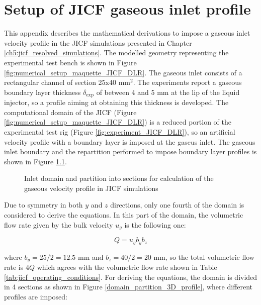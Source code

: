 \chapter{Setup of JICF gaseous inlet profile}
\label{app:JICF_BL_setup}

This appendix describes the mathematical derivations to impose a gaseous inlet velocity profile in the JICF simulations presented in Chapter \ref{ch5:jicf_resolved_simulations}. The modelled geometry representing the experimental test bench is shown in Figure \ref{fig:numerical_setup_maquette_JICF_DLR}. The gaseous inlet consists of a rectangular channel of section 25x40 mm$^2$. The experiments  report a gaseous boundary layer thickness $\delta_\mathrm{exp}$ of between 4 and 5 mm at the lip of the liquid injector, so a profile aiming at obtaining this thickness is developed. The computational domain of the JICF (Figure \ref{fig:numerical_setup_maquette_JICF_DLR}) is a reduced portion of the experimental test rig (Figure \ref{fig:experiment_JICF_DLR}), so an artificial velocity profile with a boundary layer is imposed at the gaseus inlet. The gaseous inlet boundary and the repartition performed to impose boundary layer profiles is shown in Figure \ref{fig:domain_partition_3D_profile}.


\begin{figure}[h!]	
	\centering
%	
	\caption{Inlet domain and partition into sections for calculation of the gaseous velocity profile in JICF simulations}
	\label{fig:domain_partition_3D_profile}
\end{figure}



Due to symmetry in both $y$ and $z$ directions, only one fourth of the domain is considered to derive the equations. In this part of the domain, the volumetric flow rate given by the bulk velocity $u_g$ is the following one:

\begin{equation}
\label{eq:volumetric_flow_rate_2D}
Q = u_g b_y b_z
\end{equation}	

where $b_y = 25/2 = 12.5$ mm and $b_z = 40/2 = 20$ mm, so the total volumetric flow rate is $4Q$ which agrees with the volumetric flow rate shown in Table \ref{tab:jicf_operating_conditions}. For deriving the equations, the domain is divided in 4 sections as shown in Figure \ref{domain_partition_3D_profile}, where different profiles are imposed:

